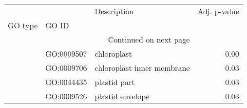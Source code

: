\begin{longtable}{lllr}
\toprule
   &            &                 Description &  Adj. p-value \\
GO type & GO ID &                             &               \\
\midrule
\endhead
\midrule
\multicolumn{3}{r}{{Continued on next page}} \\
\midrule
\endfoot

\bottomrule
\endlastfoot
\multirow{4}{*}{CC} & GO:0009507 &                 chloroplast &          0.00 \\
   & GO:0009706 &  chloroplast inner membrane &          0.03 \\
   & GO:0044435 &                plastid part &          0.03 \\
   & GO:0009526 &            plastid envelope &          0.03 \\
\end{longtable}
